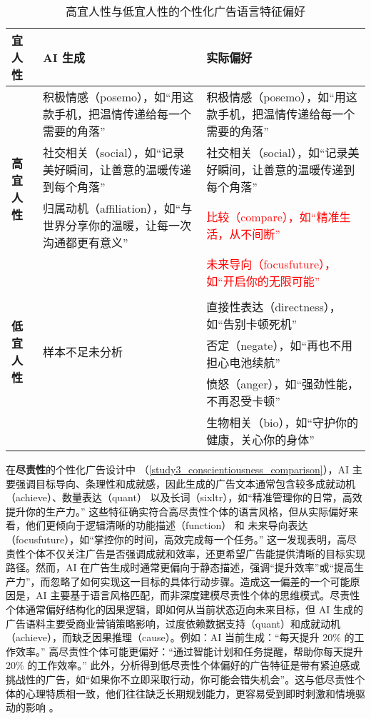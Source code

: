 \begin{table}[H]
    \centering
    \caption{\label{tab:study3_agreeableness_comparison} 高宜人性与低宜人性的个性化广告语言特征偏好}
    {\tablesongti %
    \renewcommand{\arraystretch}{1.5} %
    \begin{tabularx}{\linewidth}{l X X} %
        \toprule
        \textbf{宜人性} & \textbf{AI 生成} & \textbf{实际偏好} \\
        \midrule
        \multirow{4}{*}{\textbf{高宜人性}} 
        & 积极情感（posemo），如“用这款手机，把温情传递给每一个需要的角落” & 积极情感（posemo），如“用这款手机，把温情传递给每一个需要的角落” \\
        & 社交相关（social），如“记录美好瞬间，让善意的温暖传递到每个角落” & 社交相关（social），如“记录美好瞬间，让善意的温暖传递到每个角落” \\
        & 归属动机（affiliation），如“与世界分享你的温暖，让每一次沟通都更有意义” &  \textcolor{red}{比较（compare），如“精准生活，从不间断”} \\
        & &  \textcolor{red}{未来导向（focusfuture），如“开启你的无限可能”}  \\
        \midrule
        \multirow{4}{*}{\textbf{低宜人性}} 
        & \multirow{4}{*}{样本不足未分析} \\
        & & 直接性表达（directness），如“告别卡顿死机” \\
        & & 否定（negate），如“再也不用担心电池续航” \\
        & & 愤怒（anger），如“强劲性能，不再忍受卡顿” \\
        & & 生物相关（bio），如“守护你的健康，关心你的身体” \\
        \bottomrule
    \end{tabularx}
    }
\end{table}


在\textbf{尽责性}的个性化广告设计中 （\ref{study3_conscientiousness_comparison}），AI 主要强调目标导向、条理性和成就感，因此生成的广告文本通常包含较多成就动机（achieve）、数量表达（quant） 以及长词（sixltr），如“精准管理你的日常，高效提升你的生产力。” 这些特征确实符合高尽责性个体的语言风格，但从实际偏好来看，他们更倾向于逻辑清晰的功能描述（function） 和 未来导向表达（focusfuture），如“掌控你的时间，高效完成每一个任务。” 这一发现表明，高尽责性个体不仅关注广告是否强调成就和效率，还更希望广告能提供清晰的目标实现路径。然而，AI 在广告生成时通常更偏向于静态描述，强调“提升效率”或“提高生产力”，而忽略了如何实现这一目标的具体行动步骤。造成这一偏差的一个可能原因是，AI 主要基于语言风格匹配，而非深度建模尽责性个体的思维模式。尽责性个体通常偏好结构化的因果逻辑，即如何从当前状态迈向未来目标，但 AI 生成的广告语料主要受商业营销策略影响，过度依赖数据支持（quant）和成就动机（achieve），而缺乏因果推理（cause）。例如：AI 当前生成：“每天提升 20\% 的工作效率。” 高尽责性个体可能更偏好：“通过智能计划和任务提醒，帮助你每天提升 20\% 的工作效率。” 此外，分析得到低尽责性个体偏好的广告特征是带有紧迫感或挑战性的广告，如“如果你不立即采取行动，你可能会错失机会”。这与低尽责性个体的心理特质相一致，他们往往缺乏长期规划能力，更容易受到即时刺激和情境驱动的影响 \citep{deyoung2010impulsivity}。

